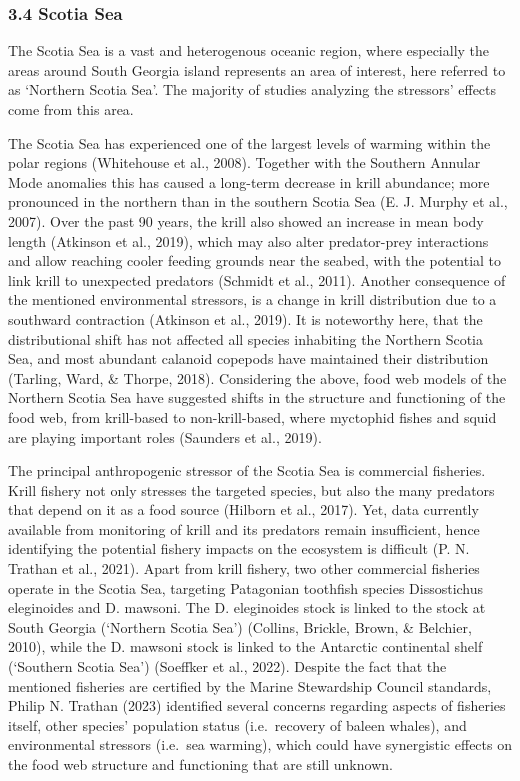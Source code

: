 \documentclass[
]{article}
\begin{document}
\subsubsection{3.4 Scotia Sea}\label{scotia-sea}

The Scotia Sea is a vast and heterogenous oceanic region, where
especially the areas around South Georgia island represents an area of
interest, here referred to as `Northern Scotia Sea'. The majority of
studies analyzing the stressors' effects come from this area.

The Scotia Sea has experienced one of the largest levels of warming
within the polar regions (Whitehouse et al., 2008). Together with the
Southern Annular Mode anomalies this has caused a long-term decrease in
krill abundance; more pronounced in the northern than in the southern
Scotia Sea (E. J. Murphy et al., 2007). Over the past 90 years, the
krill also showed an increase in mean body length (Atkinson et al.,
2019), which may also alter predator-prey interactions and allow
reaching cooler feeding grounds near the seabed, with the potential to
link krill to unexpected predators (Schmidt et al., 2011). Another
consequence of the mentioned environmental stressors, is a change in
krill distribution due to a southward contraction (Atkinson et al.,
2019). It is noteworthy here, that the distributional shift has not
affected all species inhabiting the Northern Scotia Sea, and most
abundant calanoid copepods have maintained their distribution (Tarling,
Ward, \& Thorpe, 2018). Considering the above, food web models of the
Northern Scotia Sea have suggested shifts in the structure and
functioning of the food web, from krill-based to non-krill-based, where
myctophid fishes and squid are playing important roles (Saunders et al.,
2019).

The principal anthropogenic stressor of the Scotia Sea is commercial
fisheries. Krill fishery not only stresses the targeted species, but
also the many predators that depend on it as a food source (Hilborn et
al., 2017). Yet, data currently available from monitoring of krill and
its predators remain insufficient, hence identifying the potential
fishery impacts on the ecosystem is difficult (P. N. Trathan et al.,
2021). Apart from krill fishery, two other commercial fisheries operate
in the Scotia Sea, targeting Patagonian toothfish species Dissostichus
eleginoides and D. mawsoni. The D. eleginoides stock is linked to the
stock at South Georgia (`Northern Scotia Sea') (Collins, Brickle, Brown,
\& Belchier, 2010), while the D. mawsoni stock is linked to the
Antarctic continental shelf (`Southern Scotia Sea') (Soeffker et al.,
2022). Despite the fact that the mentioned fisheries are certified by
the Marine Stewardship Council standards, Philip N. Trathan (2023)
identified several concerns regarding aspects of fisheries itself, other
species' population status (i.e.~recovery of baleen whales), and
environmental stressors (i.e.~sea warming), which could have synergistic
effects on the food web structure and functioning that are still
unknown.
\end{document}
